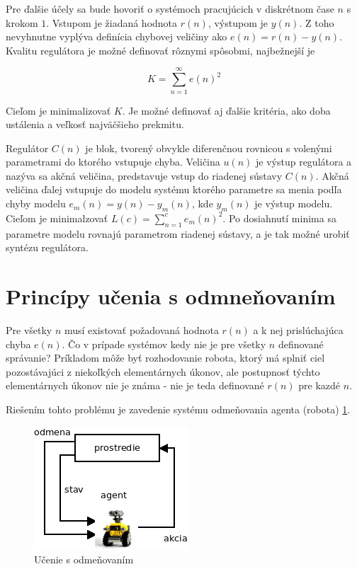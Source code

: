Pre ďalšie účely sa bude hovoriť o systémoch pracujúcich v diskrétnom čase $n$ s
krokom $1$. Vstupom je žiadaná hodnota $r(n)$, výstupom je $y(n)$. Z toho nevyhnutne
vyplýva definícia chybovej veličiny ako $e(n) = r(n) - y(n)$.
Kvalitu regulátora je možné definovať rôznymi spôsobmi, najbežnejší je

\begin{equation}
K = \sum\limits_{n=1}^{\infty}{e(n)^2}
\label{eq:controller_quality}
\end{equation}

Cieľom je minimalizovať $K$. Je možné definovať aj ďalšie kritéria,
ako doba ustálenia a veľkosť najväčšieho prekmitu.

Regulátor $C(n)$ je blok, tvorený obvykle diferenčnou rovnicou s volenými
parametrami do ktorého vstupuje chyba.
Veličina $u(n)$ je výstup regulátora a nazýva sa akčná veličina, predstavuje
vstup do riadenej sústavy $C(n)$. Akčná veličina ďalej vstupuje do modelu systému
ktorého parametre sa menia podľa chyby modelu $e_m(n) = y(n) - y_m(n)$, kde $y_m(n)$
je výstup modelu. Cieľom je minimalzovať $L(c) = \sum\limits_{n=1}^{c}{{e_m}(n)^2}$.
Po dosiahnutí minima sa parametre modelu rovnajú parametrom riadenej sústavy,
a je tak možné urobiť syntézu regulátora.


\section{Princípy učenia s odmneňovaním}

Pre všetky $n$ musí existovať požadovaná hodnota $r(n)$ a k nej prislúchajúca
chyba $e(n)$. Čo v prípade systémov kedy nie je pre všetky $n$ definované správanie?
Príkladom môže byť rozhodovanie robota, ktorý má splniť ciel pozostávajúci z
niekoľkých elementárnych úkonov, ale postupnosť týchto elementárnych úkonov nie je známa -
nie je teda definované $r(n)$ pre kazdé $n$.

Riešením tohto problému je zavedenie systému odmeňovania agenta (robota) \ref{img:reinforcement_learning}.

\begin{figure}[!htb]
\center
\includegraphics[scale=.8]{../diagrams/agent.png}
\caption{Učenie s odmeňovaním}
\label{img:reinforcement_learning}
\end{figure}

